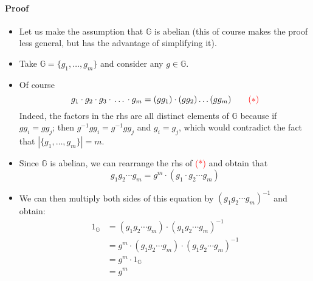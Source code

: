 \documentclass[../main]{subfiles}
\begin{document}
\paragraph{Proof}
	\begin{itemize}
		\item Let us make the assumption that $\mathbb{G}$ is abelian (this of course makes the proof less general, but has the advantage of simplifying it).
		\item Take $\mathbb{G} = \{g_1, \ldots, g_m\}$ and consider any $g \in{} \mathbb{G}$.
		\item Of course
				$$g_1 \cdot{} g_2 \cdot{} g_3 \cdot{} \ldots{} \cdot{} g_m = (gg_1)\cdot{}(gg_2)\ldots(gg_m) \quad\quad \textcolor{red}{(*)}$$
				Indeed, the factors in the rhs are all distinct elements of $\mathbb{G}$ because if $gg_i = gg_j$;
				\newline
				then $g^{-1}gg_i = g^{-1}gg_j$ and $g_i = g_j$, which would contradict the fact that $|\{g_1, \ldots, g_m\}| = m$.
		\item Since $\mathbb{G}$ is abelian, we can rearrange the rhs of \textcolor{red}{(*)} and obtain that
				$$g_1g_2 \cdots{} g_m = g^m \cdot{} (g_1 \cdot{} g_2 \cdots g_m)$$
		\item We can then multiply both sides of this equation by $(g_1 g_2 \cdots{} g_m)^{-1}$ and obtain:
				\begin{align*}
					1_{\mathbb{G}} &= (g_1 g_2 \cdots{} g_m) \cdot (g_1 g_2 \cdots{} g_m)^{-1}	\\
					&= g^m \cdot (g_1 g_2 \cdots{} g_m) \cdot (g_1 g_2 \cdots{} g_m)^{-1}		\\
					&= g^m \cdot 1_{\mathbb{G}}										\\
					&= g^m
				\end{align*}
	\end{itemize}
\end{document}

